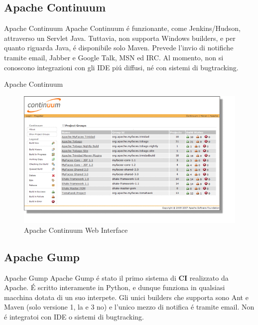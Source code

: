 \documentclass{beamer}
\begin{document}
\subsection{Apache Continuum}
\begin{frame}{Apache Continuum}
Apache Continuum \'e funzionante, come Jenkins/Hudson, attraverso un Servlet Java. Tuttavia, non supporta Windows builders,
e per quanto riguarda Java, \'e disponibile solo Maven. Prevede l'invio di notifiche tramite email, Jabber e Google Talk, MSN ed
IRC. Al momento, non si conoscono integrazioni con gli IDE pi\'u diffusi, n\'e con sistemi di bugtracking.
\end{frame}


\begin{frame}{Apache Continuum}
\begin{figure}
  \centering
  \includegraphics[scale=0.35]{images/apache_continuum.png}
  \caption{Apache Continuum Web Interface}
\end{figure}
\end{frame}


\subsection{Apache Gump}
\begin{frame}{Apache Gump}
Apache Gump \'e stato il primo sistema di \textbf{CI} realizzato da Apache. \'E scritto interamente in Python, e dunque funziona
in qualsiasi macchina dotata di un suo interpete. Gli unici builders che supporta sono Ant e Maven (solo versione 1, la e 3 no)
e l'unico mezzo di notifica \'e tramite email. Non \'e integratoi con IDE o sistemi di bugtracking. 
\end{frame}
\end{document}

